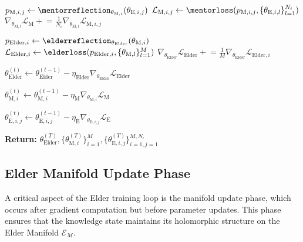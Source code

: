 \begin{algorithm}
\begin{algorithmic}[1]
            \State $p_{\text{M},i,j} \gets \mentorreflection_{\theta_{\text{M},i}}(\theta_{\text{E},i,j})$ 
            \State $\mathcal{L}_{\text{M},i,j} \gets \mentorloss(p_{\text{M},i,j}, \{\theta_{\text{E},i,l}\}_{l=1}^{N_i})$ 
            \State $\nabla_{\theta_{\text{M},i}} \mathcal{L}_{\text{M}} \mathrel{+}= \frac{1}{N_i} \nabla_{\theta_{\text{M},i}} \mathcal{L}_{\text{M},i,j}$ 
        \EndFor
        
        \State $p_{\text{Elder},i} \gets \elderreflection_{\theta_{\text{Elder}}}(\theta_{\text{M},i})$ 
        \State $\mathcal{L}_{\text{Elder},i} \gets \elderloss(p_{\text{Elder},i}, \{\theta_{\text{M},l}\}_{l=1}^{M})$ 
        \State $\nabla_{\theta_{\text{Elder}}} \mathcal{L}_{\text{Elder}} \mathrel{+}= \frac{1}{M} \nabla_{\theta_{\text{Elder}}} \mathcal{L}_{\text{Elder},i}$ 
    \EndFor
    
    \State $\theta_{\text{Elder}}^{(t)} \gets \theta_{\text{Elder}}^{(t-1)} - \eta_{\text{Elder}} \nabla_{\theta_{\text{Elder}}} \mathcal{L}_{\text{Elder}}$ 
    
        \State $\theta_{\text{M},i}^{(t)} \gets \theta_{\text{M},i}^{(t-1)} - \eta_{\text{M}} \nabla_{\theta_{\text{M},i}} \mathcal{L}_{\text{M}}$ 
        
            \State $\theta_{\text{E},i,j}^{(t)} \gets \theta_{\text{E},i,j}^{(t-1)} - \eta_{\text{E}} \nabla_{\theta_{\text{E},i,j}} \mathcal{L}_{\text{E}}$ 
        \EndFor
    \EndFor
\EndFor

\State \textbf{Return:} $\theta_{\text{Elder}}^{(T)}, \{\theta_{\text{M},i}^{(T)}\}_{i=1}^M, \{\theta_{\text{E},i,j}^{(T)}\}_{i=1,j=1}^{M,N_i}$
\end{algorithmic}
\end{algorithm}

\subsection{Elder Manifold Update Phase}

A critical aspect of the Elder training loop is the manifold update phase, which occurs after gradient computation but before parameter updates. This phase ensures that the knowledge state maintains its holomorphic structure on the Elder Manifold $\mathcal{E}_{\mathcal{M}}$.

